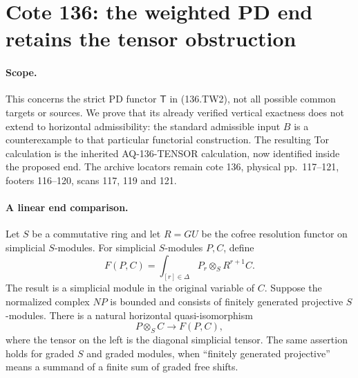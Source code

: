 \section{Cote 136: the weighted PD end retains the tensor obstruction}
\label{sec:136twtor}

\paragraph{Scope.}
This concerns the strict PD functor $\mathsf T$ in
(136.TW2), not all possible common targets or sources.
We prove that its already verified vertical exactness
does not extend to horizontal admissibility: the standard
admissible input $B$ is a counterexample to that particular
functorial construction. The resulting Tor calculation
is the inherited AQ-136-TENSOR calculation, now identified
inside the proposed end. The archive locators remain
cote 136, physical pp.~117--121, footers 116--120,
scans 117, 119 and 121.

\paragraph{A linear end comparison.}
Let $S$ be a commutative ring and let $R=GU$ be the
cofree resolution functor on simplicial $S$-modules.
For simplicial $S$-modules $P,C$, define
\[
 F(P,C)=\int_{[r]\in\Delta}
                  P_r\otimes_S R^{r+1}C.                \tag{136.TO1}
\]
The result is a simplicial module in the original
variable of $C$. Suppose the normalized complex $NP$
is bounded and consists of finitely generated projective
$S$-modules. There is a natural horizontal quasi-isomorphism
\[
                      P\otimes_S C\longrightarrow F(P,C),
                                                               \tag{136.TO2}
\]
where the tensor on the left is the diagonal simplicial
tensor. The same assertion holds for graded $S$ and
graded modules, when ``finitely generated projective''
means a summand of a finite sum of graded free shifts.

